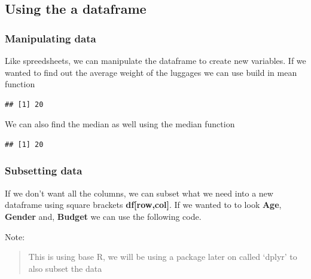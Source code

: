\documentclass[
]{book}
\newenvironment{Shaded}{\begin{snugshade}}{\end{snugshade}}
\newcommand{\FunctionTok}[1]{\textcolor[rgb]{0.00,0.00,0.00}{#1}}
\newcommand{\NormalTok}[1]{#1}
\newcommand{\SpecialCharTok}[1]{\textcolor[rgb]{0.00,0.00,0.00}{#1}}
\begin{document}
\hypertarget{using-the-a-dataframe}{%
\subsection{Using the a dataframe}\label{using-the-a-dataframe}}

\hypertarget{manipulating-data}{%
\subsubsection{Manipulating data}\label{manipulating-data}}

Like spreedsheets, we can manipulate the dataframe to create new variables. If we wanted to find out the average weight of the luggages we can use build in mean function

\begin{Shaded}
\end{Shaded}

\begin{verbatim}
## [1] 20
\end{verbatim}

We can also find the median as well using the median function

\begin{Shaded}
\end{Shaded}

\begin{verbatim}
## [1] 20
\end{verbatim}

\hypertarget{subsetting-data}{%
\subsubsection{Subsetting data}\label{subsetting-data}}

If we don't want all the columns, we can subset what we need into a new dataframe using square brackets \textbf{df{[}row,col{]}}. If we wanted to to look \textbf{Age}, \textbf{Gender} and, \textbf{Budget} we can use the following code.

Note:

\begin{quote}
This is using base R, we will be using a package later on called `dplyr' to also subset the data
\end{quote}
\end{document}
